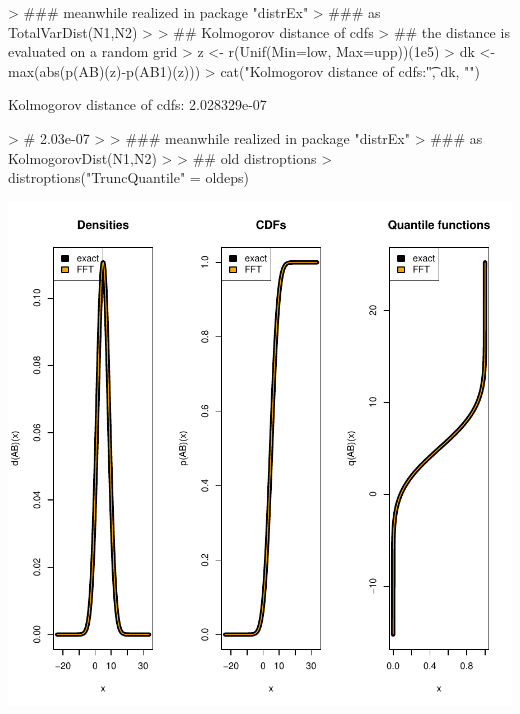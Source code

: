 \documentclass[11pt]{article}
\begin{document}
\begin{Schunk}
\begin{Soutput}
\end{Soutput}
\begin{Sinput}
> ### meanwhile realized in package "distrEx" 
> ### as TotalVarDist(N1,N2)
> 
> ## Kolmogorov distance of cdfs 
> ## the distance is evaluated on a random grid
> z <- r(Unif(Min=low, Max=upp))(1e5)
> dk <- max(abs(p(AB)(z)-p(AB1)(z)))
> cat("Kolmogorov distance of cdfs:\t", dk, "\n") 
\end{Sinput}
\begin{Soutput}
Kolmogorov distance of cdfs:	 2.028329e-07 
\end{Soutput}
\begin{Sinput}
> # 2.03e-07
> 
> ### meanwhile realized in package "distrEx" 
> ### as KolmogorovDist(N1,N2)
> 
> ## old distroptions
> distroptions("TruncQuantile" = oldeps)
\end{Sinput}
\end{Schunk}
\includegraphics{distr-ConvolutionNormalDistr}
\end{document}
